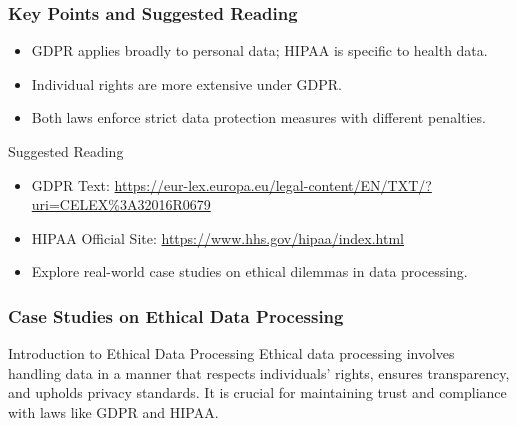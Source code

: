 \documentclass{beamer}
\begin{document}
\begin{frame}[fragile]
    \frametitle{Key Points and Suggested Reading}
    \begin{itemize}
        \item GDPR applies broadly to personal data; HIPAA is specific to health data.
        \item Individual rights are more extensive under GDPR.
        \item Both laws enforce strict data protection measures with different penalties.
    \end{itemize}

    \begin{block}{Suggested Reading}
        \begin{itemize}
            \item GDPR Text: \url{https://eur-lex.europa.eu/legal-content/EN/TXT/?uri=CELEX%3A32016R0679}
            \item HIPAA Official Site: \url{https://www.hhs.gov/hipaa/index.html}
        \end{itemize}
    \end{block}
    
    \begin{itemize}
        \item Explore real-world case studies on ethical dilemmas in data processing.
    \end{itemize}
\end{frame}

\begin{frame}[fragile]
    \frametitle{Case Studies on Ethical Data Processing}
    \begin{block}{Introduction to Ethical Data Processing}
        Ethical data processing involves handling data in a manner that respects individuals' rights, ensures transparency, and upholds privacy standards. It is crucial for maintaining trust and compliance with laws like GDPR and HIPAA.
    \end{block}
\end{frame}
\end{document}
